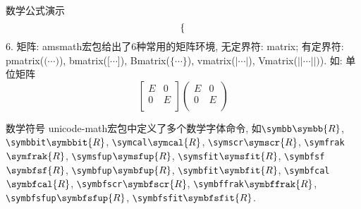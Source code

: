 \documentclass[hyperref, UTF8, CJK, aspectratio=169]{beamer}
\begin{document}
\begin{frame}{数学公式演示}
\begin{equation}
\begin{dcases}
			\end{dcases}
		\end{equation}
	{\color{scured}6. 矩阵:} amsmath宏包给出了6种常用的矩阵环境, 无定界符: {\color{scured}matrix}; 有定界符: {\color{scured}pmatrix}($\big(\cdots\big)$), {\color{scured}bmatrix}($\big[\cdots\big]$), {\color{scured}Bmatrix}($\bigl\{\cdots\bigr\}$), {\color{scured}vmatrix}($|\cdots|$), {\color{scured}Vmatrix}($||\cdots||)$).
	如: 单位矩阵
		\[
		\begin{bmatrix}
		E & 0 \\
		0 & E \\
		\end{bmatrix}
		\begin{pmatrix}
			E & 0 \\
			0 & E \\
		\end{pmatrix}
		\]
\end{frame}

\begin{frame}[fragile]{数学符号}
  unicode-math宏包中定义了多个数学字体命令, 如\verb|\symbb|$\symbb{R}$, \verb|\symbbit|$\symbbit{R}$, \verb|\symcal|$\symcal{R}$, \verb|\symscr|$\symscr{R}$, \verb|\symfrak|$\symfrak{R}$, \verb|\symsfup|$\symsfup{R}$, \verb|\symsfit|$\symsfit{R}$, \verb|\symbfsf|$\symbfsf{R}$, \verb|\symbfup|$\symbfup{R}$, \verb|\symbfit|$\symbfit{R}$, \verb|\symbfcal|$\symbfcal{R}$, \verb|\symbfscr|$\symbfscr{R}$, \verb|\symbffrak|$\symbffrak{R}$, \verb|\symbfsfup|$\symbfsfup{R}$, \verb|\symbfsfit|$\symbfsfit{R}$.\\
\end{frame}
\end{document}
